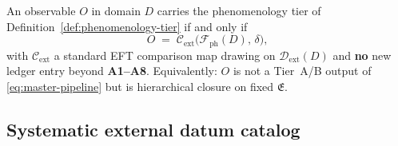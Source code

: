 \begin{proposition}
\label{prop:thread-9-tier}
An observable $O$ in domain $D$ carries the phenomenology tier of
Definition~\ref{def:phenomenology-tier} if and only if
\begin{equation}\label{eq:thread9-tier-iff}
  O
  \;=\;
  \mathcal{C}_{\mathrm{ext}}\!\bigl(
    \mathcal{F}_{\mathrm{ph}}(D),\,\delta
  \bigr),
\end{equation}
with $\mathcal{C}_{\mathrm{ext}}$ a standard EFT comparison map drawing on
$\mathcal{D}_{\mathrm{ext}}(D)$ and \textbf{no} new ledger entry beyond
\textbf{A1--A8}. Equivalently: $O$ is not a Tier~A/B output of
\eqref{eq:master-pipeline} but is hierarchical closure on fixed
$\mathfrak{E}$.
\end{proposition}

\subsection{Systematic external datum catalog}
\label{sec:wave6-thread9:dext}

